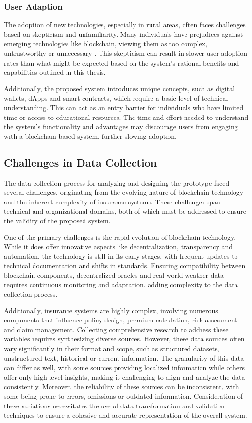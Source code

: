 \subsubsection{User Adaption}
The adoption of new technologies, especially in rural areas, often faces challenges based on skepticism and unfamiliarity. Many individuals have prejudices against emerging technologies like blockchain, viewing them as too complex, untrustworthy or unnecessary \autocite{Alabdali2023Influential}. This skepticism can result in slower user adoption rates than what might be expected based on the system's rational benefits and capabilities outlined in this thesis.

Additionally, the proposed system introduces unique concepts, such as digital wallets, dApps and smart contracts, which require a basic level of technical understanding. This can act as an entry barrier for individuals who have limited time or access to educational resources. The time and effort needed to understand the system's functionality and advantages may discourage users from engaging with a blockchain-based system, further slowing adoption.

\subsection{Challenges in Data Collection}
The data collection process for analyzing and designing the prototype faced several challenges, originating from the evolving nature of blockchain technology and the inherent complexity of insurance systems. These challenges span technical and organizational domains, both of which must be addressed to ensure the validity of the proposed system.

One of the primary challenges is the rapid evolution of blockchain technology. While it does offer innovative aspects like decentralization, transparency and automation, the technology is still in its early stages, with frequent updates to technical documentation and shifts in standards. Ensuring compatibility between blockchain components, decentralized oracles and real-world weather data requires continuous monitoring and adaptation, adding complexity to the data collection process.

Additionally, insurance systems are highly complex, involving numerous components that influence policy design, premium calculation, risk assessment and claim management. Collecting comprehensive research to address these variables requires synthesizing diverse sources. However, these data sources often vary significantly in their format and scope, such as structured datasets, unstructured text, historical or current information. The granularity of this data can differ as well, with some sources providing localized information while others offer only high-level insights, making it challenging to align and analyze the data consistently. Moreover, the reliability of these sources can be inconsistent, with some being prone to errors, omissions or outdated information. Consideration of these variations necessitates the use of data transformation and validation techniques to ensure a cohesive and accurate representation of the overall system.

